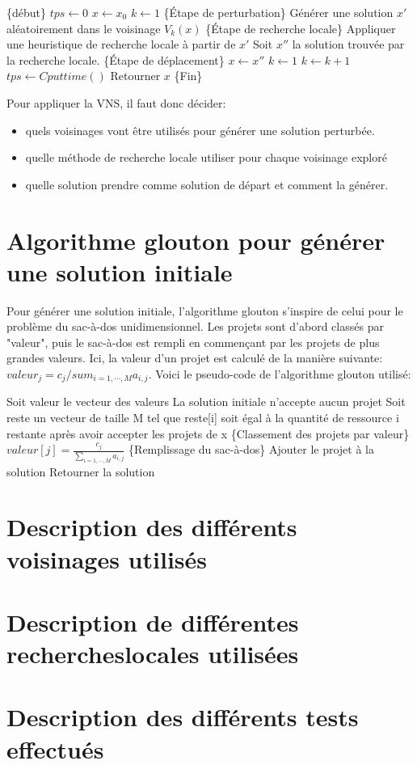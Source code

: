 \documentclass[fleqn]{article}
\begin{document}
\begin{algorithmic}
\STATE \{début\}
\STATE $tps \gets 0$
\STATE $x \gets x_0$
\STATE $k \gets 1$
\STATE \{Étape de perturbation\}
\STATE Générer une solution $x'$ aléatoirement dans le voisinage $V_{k}(x)$
\STATE \{Étape de recherche locale\}
\STATE Appliquer une heuristique de recherche locale à partir de $x'$
\STATE Soit $x''$ la solution trouvée par la recherche locale.
\STATE \{Étape de déplacement\}
\STATE $x \gets x''$
\STATE $k \gets 1$
\ELSE
\STATE $k \gets k+1$
\ENDIF
\ENDWHILE
\STATE $tps \gets Cputtime()$
\ENDWHILE
\STATE Retourner $x$
\STATE \{Fin\}
\end{algorithmic}
Pour appliquer la VNS, il faut donc décider:
\begin{itemize} 
\item quels voisinages vont être utilisés pour générer une solution perturbée.
\item quelle méthode de recherche locale utiliser pour chaque voisinage exploré
\item quelle solution prendre comme solution de départ et comment la générer.
\end{itemize}
\section{Algorithme glouton pour générer une solution initiale}

Pour générer une solution initiale, l'algorithme glouton s'inspire de celui pour le problème du sac-à-dos unidimensionnel. Les projets sont d'abord classés par "valeur", puis le sac-à-dos est rempli en commençant par les projets de plus grandes valeurs. 
Ici, la valeur d'un projet est calculé de la manière suivante: $valeur_{j}=c_{j}/sum_{i=1,\cdots,M}a_{i,j}$.
Voici le pseudo-code de l'algorithme glouton utilisé:
\begin{algorithmic}
\STATE Soit valeur le vecteur des valeurs
\STATE La solution initiale n'accepte aucun projet
\STATE Soit reste un vecteur de taille M tel que reste[i] soit égal à la quantité de ressource i restante après avoir accepter les projets de x
\STATE	\{Classement des projets par valeur\}
\STATE $valeur[j]= \frac{c_{j}}{\sum_{i=1,\cdots,M} a_{i,j}}$
\ENDFOR
\STATE \{Remplissage du sac-à-dos\}
\STATE Ajouter le projet à la solution 
\ENDIF
\ENDFOR
\STATE Retourner la solution
\end{algorithmic}
\section{Description des différents voisinages utilisés}
\section{Description de différentes rechercheslocales utilisées}
\section{Description des différents tests effectués}
\end{document}

